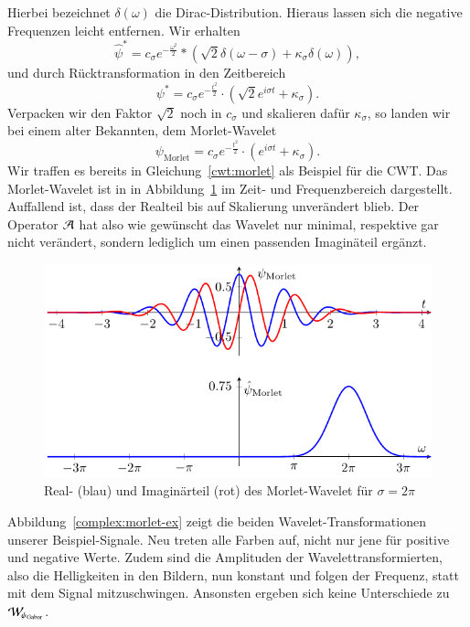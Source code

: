 Hierbei bezeichnet $\delta(\omega)$ die Dirac-Distribution.
Hieraus lassen sich die negative Frequenzen leicht entfernen.
Wir erhalten
\[
	\hat{\psi}^\ast = 
	c_\sigma e^{- \frac{\omega^2}{2}} * (
	\sqrt 2 \delta(\omega - \sigma) +
	\kappa_\sigma\delta(\omega) ),
\]
und durch Rücktransformation in den Zeitbereich
\[
	\psi^\ast = c_\sigma e^{- \frac{t^2}{2}} \cdot (\sqrt 2 e^{i\sigma t} +	\kappa_\sigma ).
\]
Verpacken wir den Faktor $\sqrt 2$ noch in $c_\sigma$ und skalieren dafür $\kappa_\sigma$, so landen wir bei einem alter Bekannten, dem Morlet-Wavelet
\[\psi_\text{Morlet} = c_\sigma e^{- \frac{t^2}{2}} \cdot (e^{i\sigma t} + \kappa_\sigma).\]
Wir traffen es bereits in Gleichung~\eqref{cwt:morlet} als Beispiel für die CWT.
Das Morlet-Wavelet ist in in Abbildung~\ref{complex:morlet} im Zeit- und Frequenzbereich dargestellt.
Auffallend ist, dass der Realteil bis auf Skalierung unverändert blieb.
Der Operator $\Ana\,$ hat also wie gewünscht das Wavelet nur minimal, respektive gar nicht verändert, sondern lediglich um einen passenden Imaginäteil ergänzt.
\begin{figure}
	\centering
	\includegraphics{papers/complex/images/morlet.pdf}
	\caption{Real- (blau) und Imaginärteil (rot) des Morlet-Wavelet für $\sigma = 2\pi$ \label{complex:morlet}}
\end{figure}

Abbildung~\ref{complex:morlet-ex} zeigt die beiden Wavelet-Transformationen unserer Beispiel-Signale.
Neu treten alle Farben auf, nicht nur jene für positive und negative Werte.
Zudem sind die Amplituden der Wavelettransformierten, also die Helligkeiten in den Bildern, nun konstant und folgen der Frequenz, statt mit dem Signal mitzuschwingen.
Ansonsten ergeben sich keine Unterschiede zu $\Wave_{\psi_\text{Gabor}}$.

